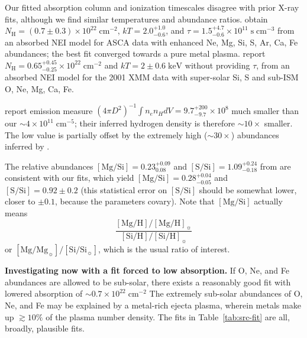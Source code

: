 \documentclass[preprint2,tighten,trackchanges]{aastex6}
\newcommand*{\mt}{\mathrm}
\newcommand*{\unit}[1]{\;\mt{#1}}  %
\newcommand*{\abt}{\mathord{\sim}} %
\newcommand*{\nH}{N_{\mathrm{H}}}
\newcommand*{\nHUnits}{\times 10^{22} \unit{cm^{-2}}}
\newcommand*{\kB}{k}  %
\begin{document}
Our fitted absorption column and ionization timescales disagree with prior
X-ray fits, although we find similar temperatures and abundance ratios.
\citet{rakowski2001} obtain $\nH = (0.7 \pm 0.3) \nHUnits$,
$\kB T = 2.0^{+1.0}_{-0.6}$, and
$\tau = 1.5^{+4.7}_{-0.6} \times 10^{11} \unit{s\;cm^{-3}}$
from an absorbed NEI model for ASCA data with enhanced Ne, Mg, Si, S, Ar, Ca,
Fe abundances; the best fit converged towards a pure metal plasma.
\citet{safi-harb2007} report $\nH = 0.65^{+0.45}_{-0.25} \nHUnits$
and $\kB T = 2 \pm 0.6 \unit{keV}$ without providing $\tau$, from
an absorbed NEI model for the 2001 XMM data with
super-solar Si, S and sub-ISM O, Ne, Mg, Ca, Fe.

\citet{rakowski2001} report emission measure
$(4\pi D^2)^{-1} \int n_e n_H dV = 9.7^{+200}_{-9.7} \times 10^8$ much smaller
than our $\abt 4 \times 10^{11} \unit{cm^{-5}}$; their inferred hydrogen
density is therefore $\abt 10\times$ smaller.
The low value is partially offset by the extremely high ($\abt 30\times$)
abundances inferred by \citet{rakowski2001}.

The relative abundances
  $[\mt{Mg}/\mt{Si}] = 0.23^{+0.09}_{0.08}$ and
  $[\mt{S}/\mt{Si}] = 1.09^{+0.24}_{-0.18}$ from \citet{rakowski2001}
are consistent with our fits, which yield $[\mt{Mg}/\mt{Si}] = 0.28^{+0.04}_{-0.05}$
and $[\mt{S}/\mt{Si}] = 0.92 \pm 0.2$ (this statistical error on
$[\mt{S}/\mt{Si}]$ should be somewhat lower, closer to $\pm 0.1$, because the
parameters covary).
Note that $[\mt{Mg}/\mt{Si}]$ actually means
\[
    \frac{[\mt{Mg}/\mt{H}] / [\mt{Mg}/\mt{H}]_{\sun}}
         {[\mt{Si}/\mt{H}] / [\mt{Si}/\mt{H}]_{\sun}}
\]
or $[\mt{Mg}/\mt{Mg}_{\sun}] / [\mt{Si}/\mt{Si}_{\sun}]$,
which is the usual ratio of interest.


\textbf{Investigating now with a fit forced to low absorption.}
If O, Ne, and Fe abundances are allowed to be sub-solar, there exists a
reasonably good fit with lowered absorption of $\abt 0.7 \nHUnits$
The extremely sub-solar abundances of O, Ne, and Fe may be explained by a
metal-rich ejecta plasma, wherein metals make up $\gtrsim 10\%$ of the plasma
number density.
The fits in Table~\ref{tab:src-fit} are all, broadly, plausible fits.
\end{document}
